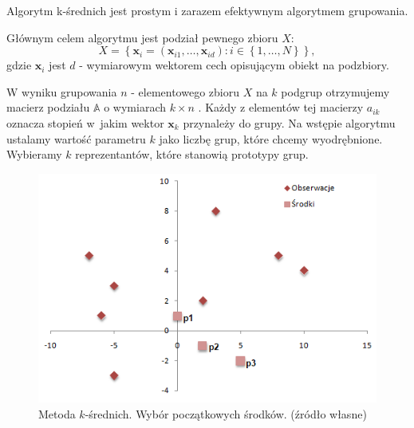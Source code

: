 \documentclass[12pt,a4paper]{report}
\newcommand{\set}[1]{\left\lbrace {#1} \right\rbrace}
\begin{document}
Algorytm k-średnich jest prostym i zarazem efektywnym algorytmem grupowania.

Głównym celem algorytmu jest podział pewnego zbioru $\mathit{X}$:
$$
\mathit{X} = \set{\mathbf{x}_i = (\mathbf{x}_{i1},\ldots,\mathbf{x}_{id}) : i \in \set{1,\ldots,N}},
$$
gdzie $\mathbf{x}_i$ jest $d$ - wymiarowym wektorem cech opisującym obiekt na podzbiory.

W wyniku grupowania $n$ - elementowego zbioru $\mathit{X}$ na $k$ podgrup otrzymujemy macierz podziału $\mathbb{A}$ o wymiarach $k\times n$ . Każdy z elementów tej macierzy $a_{ik}$ oznacza stopień w~jakim wektor $\mathbf{x}_k$ przynależy do grupy. Na wstępie algorytmu ustalamy wartość parametru $k$ jako liczbę grup, które chcemy wyodrębnione. Wybieramy $k$ reprezentantów, które stanowią prototypy grup.
\begin{center}
\begin{figure}[H]
\centering
\includegraphics[scale=0.8]{obrazy/ks_0.PNG} 
\caption{Metoda $k$-średnich. Wybór początkowych środków. (źródło własne)}
\end{figure}
\end{center}
\end{document}
